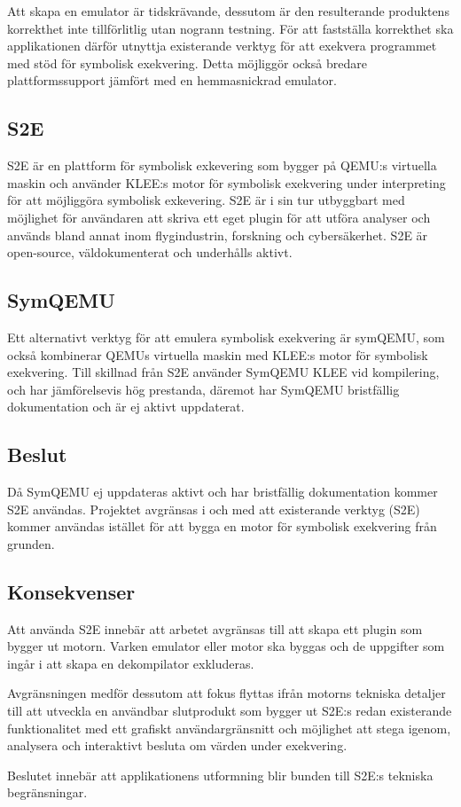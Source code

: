 
Att skapa en emulator är tidskrävande, dessutom är den resulterande produktens
korrekthet inte tillförlitlig utan nogrann testning. För att fastställa
korrekthet ska applikationen därför utnyttja existerande verktyg för att
exekvera programmet med stöd för symbolisk exekvering. Detta möjliggör också
bredare plattformssupport jämfört med en hemmasnickrad emulator.

\subsection{S2E}
S2E är en plattform för symbolisk exkevering som bygger på QEMU:s virtuella 
maskin och använder KLEE:s motor för symbolisk exekvering under interpreting 
för att möjliggöra symbolisk exkevering. S2E är i sin tur utbyggbart med möjlighet
för användaren att skriva ett eget plugin för att utföra analyser och används
bland annat inom flygindustrin, forskning och cybersäkerhet. S2E är open-source, 
väldokumenterat och underhålls aktivt.\cite{}

\subsection{SymQEMU}

Ett alternativt verktyg för att emulera symbolisk exekvering är symQEMU, som också 
kombinerar QEMUs virtuella maskin med KLEE:s motor för symbolisk exekvering. Till 
skillnad från S2E använder SymQEMU KLEE vid kompilering, och har jämförelsevis hög 
prestanda, däremot har SymQEMU bristfällig dokumentation och är ej aktivt uppdaterat. 
\cite{}

\subsection{Beslut}

Då SymQEMU ej uppdateras aktivt och har bristfällig dokumentation kommer S2E användas.
Projektet avgränsas i och med att existerande verktyg (S2E) kommer användas
istället för att bygga en motor för symbolisk exekvering från grunden. 

\subsection{Konsekvenser}

Att använda S2E innebär att arbetet avgränsas till att skapa ett plugin som bygger
ut motorn. Varken emulator eller motor ska byggas och de uppgifter som ingår i
att skapa en dekompilator exkluderas.

Avgränsningen medför dessutom att fokus flyttas ifrån motorns tekniska detaljer
till att utveckla en användbar slutprodukt som bygger ut S2E:s redan
existerande funktionalitet med ett grafiskt användargränsnitt och möjlighet att
stega igenom, analysera och interaktivt besluta om värden under exekvering.

Beslutet innebär att applikationens utformning blir bunden till S2E:s
tekniska begränsningar.
